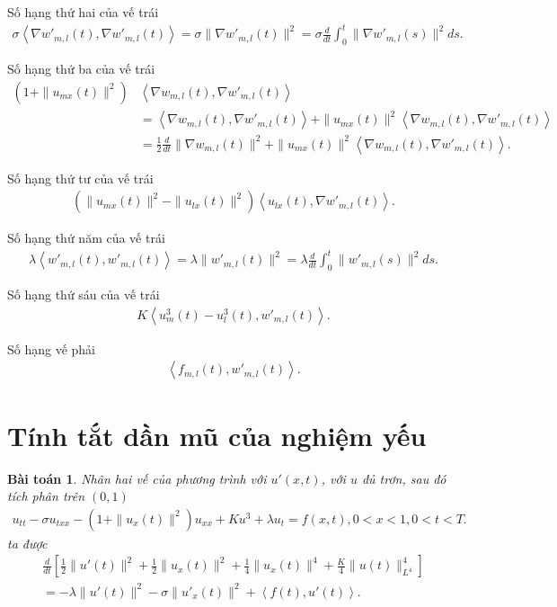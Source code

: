 \documentclass[12pt,a4paper]{article}
\newtheorem{theorem}{Bài toán}[section]
\theoremstyle{definition}
\begin{document}
Số hạng thứ hai của vế trái
\begin{align*}
    \sigma \left<\nabla w'_{m,l}(t), \nabla w'_{m,l}(t)\right>
    = \sigma \|\nabla w'_{m,l}(t)\|^2
    = \sigma \frac{d}{dt} \int_0^t \|\nabla w'_{m,l}(s)\|^2 ds.
\end{align*}

Số hạng thứ ba của vế trái
\begin{align*}
    \left(1 + \|u_{mx}(t)\|^2\right) &\left<\nabla w_{m,l}(t), \nabla w'_{m,l}(t)\right> \\
    &= \left<\nabla w_{m,l}(t), \nabla w'_{m,l}(t)\right> + \|u_{mx}(t)\|^2 \left<\nabla w_{m,l}(t), \nabla w'_{m,l}(t)\right> \\
    &= \frac{1}{2} \frac{d}{dt} \|\nabla w_{m,l}(t)\|^2 + \|u_{mx}(t)\|^2 \left<\nabla w_{m,l}(t), \nabla w'_{m,l}(t)\right>.
\end{align*}

Số hạng thứ tư của vế trái
\begin{align*}
    \left(\|u_{mx}(t)\|^2 - \|u_{lx}(t)\|^2\right) \left<u_{lx}(t),\nabla w'_{m,l}(t)\right>.
\end{align*}

Số hạng thứ năm của vế trái
\begin{align*}
    \lambda \left<w'_{m,l}(t), w'_{m,l}(t)\right>
    = \lambda \|w'_{m,l}(t)\|^2
    = \lambda \frac{d}{dt} \int_0^t \|w'_{m,l}(s)\|^2 ds.
\end{align*}

Số hạng thứ sáu của vế trái
\begin{align*}
    K \left<u^3_m(t) - u^3_l(t), w'_{m,l}(t)\right>.
\end{align*}

Số hạng vế phải
\begin{align*}
    \left<f_{m,l}(t), w'_{m,l}(t)\right>.
\end{align*}

\section{Tính tắt dần mũ của nghiệm yếu}

\begin{theorem}
Nhân hai vế của phương trình với $u'(x,t)$, với $u$ đủ trơn, sau đó tích phân trên $(0,1)$
\begin{align*}
    u_{tt} - \sigma u_{txx} - \left(1 + \|u_x(t)\|^2\right) u_{xx} + Ku^3 + \lambda u_t = f(x,t), 0 < x < 1, 0 < t < T.
\end{align*}
ta được
\begin{align*}
    \frac{d}{dt}\left[\frac{1}{2} \|u'(t)\|^2 + \frac{1}{2} \|u_x(t)\|^2 + \frac{1}{4} \|u_x(t)\|^4 + \frac{K}{4} \|u(t)\|^4_{L^4}\right] \\
    = -\lambda \|u'(t)\|^2 - \sigma \|u'_x(t)\|^2 + \left<f(t), u'(t)\right>.
\end{align*}
\end{theorem}
\end{document}
